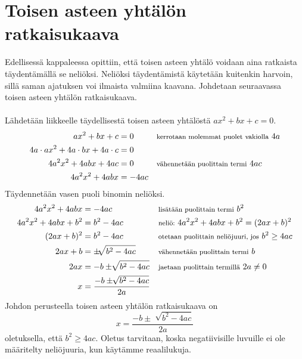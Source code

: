 \section{Toisen asteen yhtälön ratkaisukaava}

Edellisessä kappaleessa opittiin, että toisen asteen yhtälö voidaan aina ratkaista täydentämällä se neliöksi.
Neliöksi täydentämistä käytetään kuitenkin harvoin, sillä saman ajatuksen voi ilmaista valmiina kaavana.
Johdetaan seuraavassa toisen asteen yhtälön ratkaisukaava. \\ \\

Lähdetään liikkeelle täydellisestä toisen asteen yhtälöstä $ax^2+bx+c=0$.
\begin{align*}
ax^2+bx+c&=0 &&\textnormal{\footnotesize{kerrotaan molemmat puolet vakiolla}} \ 4a \\
4a \cdot ax^2+4a \cdot bx + 4a \cdot c&=0 \\
4a^2x^2+4abx+4ac&=0 &&\textnormal{\footnotesize{vähennetään puolittain termi}} \ 4ac  \\
4a^2x^2+4abx&=-4ac
\end{align*}
Täydennetään vasen puoli binomin neliöksi.
\begin{align*}
4a^2x^2+4abx&=-4ac &&\textnormal{\footnotesize{lisätään puolittain termi}} \ b^2 \\
4a^2x^2+4abx+b^2&=b^2-4ac &&\textnormal{\footnotesize{neliö:}} \ 4a^2x^2+4abx+b^2=(2ax+b)^2 \\
(2ax+b)^2&=b^2-4ac &&\textnormal{\footnotesize{otetaan puolittain neliöjuuri, jos}} \ b^2 \geq 4ac \\
2ax+b&= \pm \sqrt[]{b^2-4ac} &&\textnormal{\footnotesize{vähennetään puolittain termi}} \ b \\
2ax&=-b \pm \sqrt[]{b^2-4ac} &&\textnormal{\footnotesize{jaetaan puolittain termillä}} \ 2a \neq 0 \\
x&= \frac{-b \pm \sqrt[]{b^2-4ac}}{2a}
\end{align*}
Johdon perusteella toisen asteen yhtälön ratkaisukaava on \[x= \frac{-b \pm \sqrt[]{b^2-4ac}}{2a}\] oletuksella, että $b^2 \geq 4ac$. Oletus tarvitaan, koska negatiivisille luvuille ei ole määritelty neliöjuuria, kun käytämme reaalilukuja.\\
